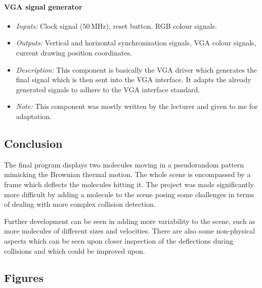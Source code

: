 \documentclass[11pt,a4paper]{article}
\def\MHz{\,\mathrm{MHz}}
\begin{document}
        \paragraph{VGA signal generator}
        \begin{itemize}
            \item \emph{Inputs:} Clock signal ($50\MHz$), reset button, RGB colour signals.
            \item \emph{Outputs:} Vertical and horizontal synchronization signals, VGA colour signals, current drawing position coordinates.
            \item \emph{Description:} This component is basically the VGA driver which generates the final signal which is then sent into the VGA interface. It adapts the already generated signals to adhere to the VGA interface standard.
            \item \emph{Note:} This component was mostly written by the lecturer and given to me for adaptation.
        \end{itemize}

    \subsection*{Conclusion}
        The final program displays two molecules moving in a pseudorandom pattern mimicking the Brownian thermal motion. The whole scene is encompassed by a frame which deflects the molecules hitting it. The project was made significantly more difficult by adding a molecule to the scene posing some challenges in terms of dealing with more complex collision detection.

        Further development can be seen in adding more variability to the scene, such as more molecules of different sizes and velocities. There are also some non-physical aspects which can be seen upon closer inspection of the deflections during collisions and which could be improved upon.




\newpage
    \subsection*{Figures}
\end{document}
